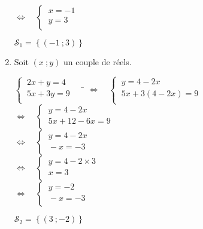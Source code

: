 \documentclass[a4paper,11pt,exos]{nsi} %
\begin{document}
\begin{enumerate}
\begin{tabbing}
            \> $\iff\quad 
            \left\{
                \begin{array}{l}
				\ x=-1 \\
				\ y=3\\
			\end{array} \right.$
    \end{tabbing}
    $\mathcal{S}_1=\left\{(-1\ ;3)\right\}$

    \item Soit $(x\ ;y)$ un couple de réels.
    \begin{tabbing}
        $\left\{
			\begin{array}{l}
				\ 2x+y=4 \\
				\ 5x+3y=9\\
			\end{array} \right. \quad$  \= $\iff\quad 
            \left\{
                \begin{array}{l}
				\ y=4-2x \\
				\ 5x+3(4-2x)=9\\
			\end{array} \right.$\\[.5em]

            \>  $\iff\quad \left\{
                \begin{array}{l}
				\ y=4-2x \\
				\ 5x+12-6x=9\\
			\end{array} \right.$\\[.5em]

            \>  $\iff\quad \left\{
                \begin{array}{l}
				\ y=4-2x \\
				\ -x=-3\\
			\end{array} \right.$\\[.5em]

            \>  $\iff\quad \left\{
                \begin{array}{l}
				\ y=4-2\times 3 \\
				\ x=3\\
			\end{array} \right.$\\[.5em]

            \>  $\iff\quad \left\{
                \begin{array}{l}
				\ y=-2 \\
				\ -x=-3\\
			\end{array} \right.$
        \end{tabbing}
        $\mathcal{S}_2=\left\{(3\ ;-2)\right\}$


\end{enumerate}
\end{document}
